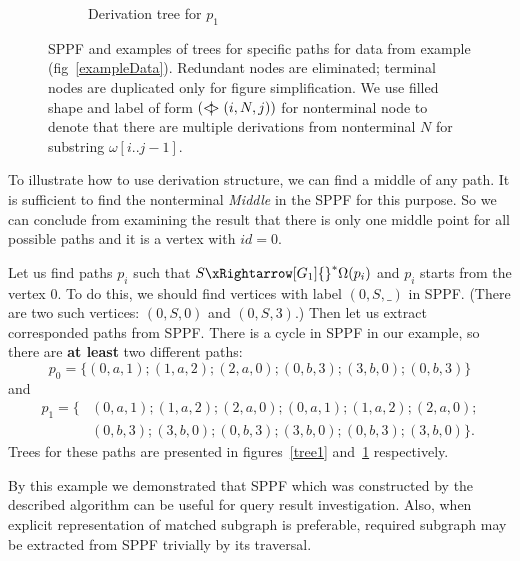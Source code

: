 \begin{figure}[ht]
\begin{center}
\begin{subfigure}[b]{0.33\textwidth}
        \caption{Derivation tree  for $p_1$}
        \label{tree2}        
    \end{subfigure}
    \caption{SPPF and examples of trees for specific paths for data from example (fig~\ref{exampleData}). Redundant nodes are eliminated; terminal nodes are duplicated only for figure simplification.
    We use filled shape and label of form $(<\mkern-11mu | \mkern-11mu> (i, N, j))$ for nonterminal node to denote that there are multiple derivations from nonterminal $N$ for substring $\omega[i..j-1]$. 
}
    \label{sppfSample}
    \end{center}                
\end{figure}

To illustrate how to use derivation structure, we can find a middle of any path. It is sufficient to find the nonterminal \textit{Middle} in the SPPF for this purpose.
So we can conclude from examining the result that there is only one middle point for all possible paths and it is a vertex with $id = 0$.

Let us find paths $p_i$ such that $S {\xRightarrow[G_1]{}}^{*} \Omega(p_i)$ and $p_i$ starts from the vertex $0$.
To do this, we should find vertices with label $(0, S, \_)$ in SPPF.
(There are two such vertices: $(0, S, 0)$ and $(0, S, 3)$.)
Then let us extract corresponded paths from SPPF.
There is a cycle in SPPF in our example, so there are \textbf{at least} two different paths: $$p_0=\{(0,a,1);(1,a,2);(2,a,0);(0,b,3);(3,b,0);(0,b,3)\}$$ and 
\begin{align*} 
p_1=\{&(0,a,1);(1,a,2);(2,a,0);(0,a,1);(1,a,2);(2,a,0);\\&(0,b,3);(3,b,0);(0,b,3);(3,b,0);(0,b,3);(3,b,0)\}.
\end{align*}
 Trees for these paths are presented in figures~\ref{tree1} and~\ref{tree2} respectively.

By this example we demonstrated that SPPF which was constructed by the described algorithm can be useful for query result investigation. 
Also, when explicit representation of matched subgraph is preferable, required subgraph may be extracted from SPPF trivially by its traversal.
